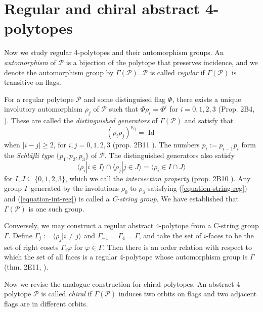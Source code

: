 \section{Regular and chiral abstract
4-polytopes}
\label{section-regular-chiral-abstract}

\noindent
Now we study regular 4-polytopes and their
automorphism groups. An \textit{automorphism}
of $\mathcal{P}$ is a bijection of the
polytope that preserves incidence, and we
denote the automorphism group by
$\Gamma(\mathcal{P})$. $\mathcal{P}$ is
called \textit{regular} if
$\Gamma(\mathcal{P})$ is transitive on flags.

For a regular polytope $\mathcal{P}$ and some
distinguised flag $\Phi$, there exists a
unique involutory automorphism $\rho_j$ of
$\mathcal{P}$ such that $\Phi\rho_i=\Phi^i$
for $i=0,1,2,3$ (Prop. 2B4,
\cite{abstract-polytopes}). These are called
the \textit{distinguished generators} of
$\Gamma(\mathcal{P})$ and satisfy that
\begin{equation}
\label{equation-string-reg}
(\rho_i\rho_j)^{p_{ij}}=\operatorname{Id}
\end{equation}
when $|i-j|\geq2$, for $i,j=0,1,2,3$ (prop.
2B11 \cite{abstract-polytopes}). The numbers
$p_i:=p_{i-1}p_i$ form the \textit{Schläfli
type} $\{p_1,p_2,p_3\}$ of $\mathcal{P}$. The
distinguished generators also satisfy
\begin{equation}
\label{equation-int-reg}
\langle \rho_i|i\in I\rangle\cap
\langle\rho_j|j\in J\rangle=
\langle\rho_i\in I\cap J\rangle
\end{equation}
for $I,J\subseteq\{0,1,2,3\}$, which we call
the \textit{intersection property} (prop.
2B10 \cite{abstract-polytopes}). Any group
$\Gamma$ generated by the involutions
$\rho_0$ to $\rho_3$ satisfying
(\ref{equation-string-reg}) and
(\ref{equation-int-reg}) is called a
\textit{C-string group}. We have established
that $\Gamma(\mathcal{P})$ is one such group.

Conversely, we may construct a regular
abstract $4$-polytope from a C-string group
$\Gamma$. Define
$\Gamma_j:=\langle\rho_j|i\neq j\rangle$ and
$\Gamma_{-1}=\Gamma_4=\Gamma$, and take the
set of $i$-faces to be the set of right
cosets $\Gamma_i\varphi$ for
$\varphi\in\Gamma$. Then there is an order
relation with respect to which the set of all
faces is a regular $4$-polytope whose
automorphism group is $\Gamma$ (thm. 2E11,
\cite{abstract-polytopes}).

\medskip\noindent
Now we revise the analogue construction for
chiral polytopes. An abstract 4-polytope
$\mathcal{P}$ is called \textit{chiral} if
$\Gamma(\mathcal{P})$ induces two orbits on
flags and two adjacent flags are in different
orbits.

